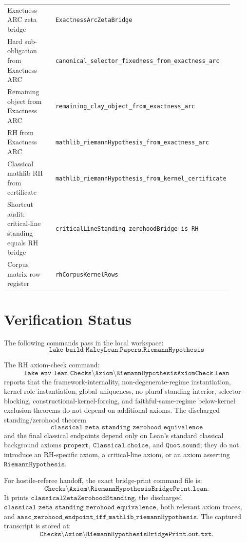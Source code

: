 \documentclass[11pt]{article}
\begin{document}
\begin{center}
\begin{longtable}{p{0.44\linewidth}p{0.48\linewidth}}
Exactness ARC zeta bridge
  & \texttt{ExactnessArcZetaBridge} \\
Hard sub-obligation from Exactness ARC
  & \texttt{canonical\_selector\_fixedness\_from\_exactness\_arc} \\
Remaining object from Exactness ARC
  & \texttt{remaining\_clay\_object\_from\_exactness\_arc} \\
RH from Exactness ARC
  & \texttt{mathlib\_riemannHypothesis\_from\_exactness\_arc} \\
Classical mathlib RH from certificate
  & \texttt{mathlib\_riemannHypothesis\_from\_kernel\_certificate} \\
Shortcut audit: critical-line standing equals RH bridge
  & \texttt{criticalLineStanding\_zerohoodBridge\_is\_RH} \\
Corpus matrix row register
  & \texttt{rhCorpusKernelRows} \\
\bottomrule
\end{longtable}
\end{center}

\section{Verification Status}

The following commands pass in the local workspace:
\[
\texttt{lake build MaleyLean.Papers.RiemannHypothesis}
\]

The RH axiom-check command:
\[
\texttt{lake env lean Checks\textbackslash Axiom\textbackslash RiemannHypothesisAxiomCheck.lean}
\]
reports that the framework-internality, non-degenerate-regime instantiation,
kernel-role instantiation, global uniqueness, no-plural standing-interior,
selector-blocking, constructional-kernel-forcing, and faithful-same-regime
below-kernel exclusion theorems do not depend on additional axioms.  The
discharged standing/zerohood theorem
\[
\texttt{classical\_zeta\_standing\_zerohood\_equivalence}
\]
and the final classical endpoints depend only on Lean's standard classical
background axioms \(\texttt{propext}\), \(\texttt{Classical.choice}\), and
\(\texttt{Quot.sound}\); they do not introduce an RH-specific axiom, a
critical-line axiom, or an axiom asserting \(\texttt{RiemannHypothesis}\).

For hostile-referee handoff, the exact bridge-print command file is:
\[
\texttt{Checks\textbackslash Axiom\textbackslash RiemannHypothesisBridgePrint.lean}.
\]
It prints \(\texttt{classicalZetaZerohoodStanding}\), the discharged
\(\texttt{classical\_zeta\_standing\_zerohood\_equivalence}\), both relevant
axiom traces, and
\(\texttt{aasc\_zerohood\_endpoint\_iff\_mathlib\_riemannHypothesis}\).  The
captured transcript is stored at:
\[
\texttt{Checks\textbackslash Axiom\textbackslash RiemannHypothesisBridgePrint.out.txt}.
\]
\end{document}
